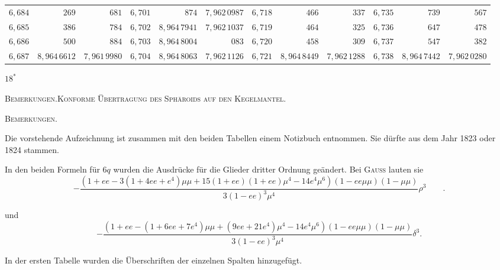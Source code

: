 \begin{center}
\begin{tabular}{|r|r|r||r|r|r||r|r|r||r|r|r|}
$6{,}684$&$269$&$681$&$6{,}701$&$874$&$7{,}962\,0987$&$6{,}718$&$466$&$337$&$6{,}735$&$739$&$567$\\
$6{,}685$&$386$&$784$&$6{,}702$&$8{,}964\,7941$&$7{,}962\,1037$&$6{,}719$&$464$&$325$&$6{,}736$&$647$&$478$\\
$6{,}686$&$500$&$884$&$6{,}703$&$8{,}964\,8004$&$083$&$6{,}720$&$458$&$309$&$6{,}737$&$547$&$382$\\
$6{,}687$&$8{,}964\,6612$&$7{,}961\,9980$&$6{,}704$&$8{,}964\,8063$&$7{,}962\,1126$&$6{,}721$&$8{,}964\,8449$&$7{,}962\,1288$&$6{,}738$&$8{,}964\,7442$&$7{,}962\,0280$\\
\end{tabular}\par\endgroup
\end{center}
\vfill\hfill$18^*$\hspace*{2cm}\par
\clearpage
{}\hfill{\footnotesize\textsc{Bemerkungen.\quad Konforme Übertragung des Sphäroids auf den Kegelmantel.}}\par\bigskip
\begin{center}\textsc{Bemerkungen.}\end{center}
\begingroup\small
Die vorstehende Aufzeichnung ist zusammen mit den beiden Tabellen einem Notizbuch entnommen. Sie dürfte aus dem Jahr 1823 oder 1824 stammen.

In den beiden Formeln für $6q$ wurden die Ausdrücke für die Glieder dritter Ordnung geändert. Bei \textsc{Gauss} lauten sie
\begingroup\footnotesize
\[
-\frac{(1+ee-3(1+4ee+e^4)\mu\mu+15(1+ee)(1+ee)\mu^4-14e^4\mu^6)(1-ee\mu\mu)(1-\mu\mu)}{3(1-ee)^3\mu^4}\rho^3\qquad .
\]
\par\endgroup
und
\begingroup\footnotesize
\[
-\frac{(1+ee-(1+6ee+7e^4)\mu\mu+(9ee+21e^4)\mu^4-14e^4\mu^6)(1-ee\mu\mu)(1-\mu\mu)}{3(1-ee)^3\mu^4}\delta^3.
\]
\par\endgroup
In der ersten Tabelle wurden die Überschriften der einzelnen Spalten hinzugefügt.

